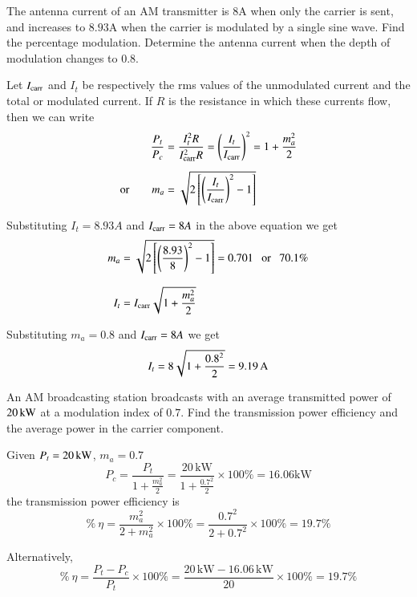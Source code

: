 \begin{example}\label{exam9.8}
The antenna current of an AM transmitter is $8\text{A}$ when only the carrier is sent, and increases to $8.93\text{A}$ when the carrier is modulated by a single sine wave. Find the percentage modulation. Determine the antenna current when the depth of modulation changes to $0.8$.
\end{example}

\begin{solution}
Let $I_{\operatorname{carr}}$ and $I_{t}$ be respectively the rms values of the unmodulated current and the total or modulated current. If $R$ is the resistance in which these currents flow, then we can write
\begin{align*}
\frac{P_{t}}{P_{c}} &=\frac{I^{2}_{t}R}{I^{2}_{\operatorname{carr}}R}=\left(\frac{I_{t}}{I_{\operatorname{carr}}}\right)^{2}=1+\frac{m^{2}_{a}}{2}\\[5pt]
\text{or}\qquad m_{a} &= \sqrt{2\left[\left(\frac{I_{t}}{I_{\operatorname{carr}}}\right)^{2}-1\right]} 
\end{align*}

Substituting $I_{t}=8.93A$ and $I_{\operatorname{carr}}=8A$ in the above equation we get
\begin{align*}
m_{a} &= \sqrt{2\left[\left(\frac{8.93}{8}\right)^{2}-1\right]}=0.701\text{~~ or~~ } 70.1\%\\[7pt]
I_{t} &= I_{\operatorname{carr}} \sqrt{1+\frac{m^{2}_{a}}{2}}
\end{align*}

Substituting $m_{a}=0.8$ and $I_{\operatorname{carr}}=8A$ we get
$$
I_{t}=8\sqrt{1+\dfrac{0.8^{2}}{2}}=9.19\text{\,A}
$$
\vskip -1cm
\end{solution}

\begin{example}\label{exam9.9}
An AM broadcasting station broadcasts with an average transmitted power of $20\text{\,kW}$ at a modulation index of $0.7$. Find the transmission power efficiency and the average power in the carrier component.
\end{example}

\begin{solution}
Given $P_{t}=20\text{\,kW}$, $m_{a}=0.7$
$$
P_{c}=\dfrac{P_{t}}{1+\frac{m^{2}_{a}}{2}}=\frac{20\,\text{kW}}{1+\frac{0.7^{2}}{2}}\times 100\%=16.06\text{kW}
$$
the transmission power efficiency is
$$
\%\ \eta =\dfrac{m^{2}_{a}}{2+m^{2}_{a}}\times 100\% =\dfrac{0.7^{2}}{2+0.7^{2}}\times 100\% = 19.7\%
$$

Alternatively,
$$
\% \ \eta =\frac{P_{t}-P_{c}}{P_{t}}\times 100\% = \frac{20\,\text{kW}-16.06\,\text{kW}}{20}\times 100\%=19.7\%
$$
\vskip -1cm
\end{solution}

